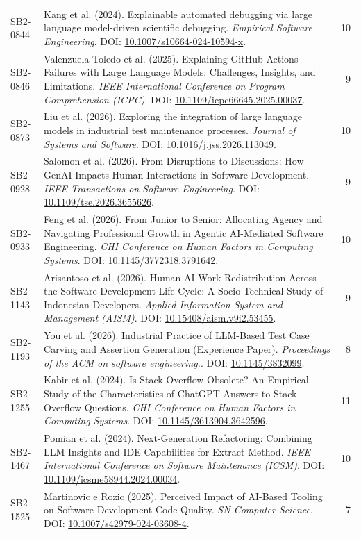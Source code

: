 \begin{small}
\begin{longtable}{lp{11.2cm}r}
SB2-0844 & Kang et al. (2024). Explainable automated debugging via large language model-driven scientific debugging. \textit{Empirical Software Engineering}. DOI: \url{10.1007/s10664-024-10594-x}. & 10 \\
SB2-0846 & Valenzuela-Toledo et al. (2025). Explaining GitHub Actions Failures with Large Language Models: Challenges, Insights, and Limitations. \textit{IEEE International Conference on Program Comprehension (ICPC)}. DOI: \url{10.1109/icpc66645.2025.00037}. & 9 \\
SB2-0873 & Liu et al. (2026). Exploring the integration of large language models in industrial test maintenance processes. \textit{Journal of Systems and Software}. DOI: \url{10.1016/j.jss.2026.113049}. & 10 \\
SB2-0928 & Salomon et al. (2026). From Disruptions to Discussions: How GenAI Impacts Human Interactions in Software Development. \textit{IEEE Transactions on Software Engineering}. DOI: \url{10.1109/tse.2026.3655626}. & 9 \\
SB2-0933 & Feng et al. (2026). From Junior to Senior: Allocating Agency and Navigating Professional Growth in Agentic AI-Mediated Software Engineering. \textit{CHI Conference on Human Factors in Computing Systems}. DOI: \url{10.1145/3772318.3791642}. & 10 \\
SB2-1143 & Arisantoso et al. (2026). Human-AI Work Redistribution Across the Software Development Life Cycle: A Socio-Technical Study of Indonesian Developers. \textit{Applied Information System and Management (AISM)}. DOI: \url{10.15408/aism.v9i2.53455}. & 9 \\
SB2-1193 & You et al. (2026). Industrial Practice of LLM-Based Test Case Carving and Assertion Generation (Experience Paper). \textit{Proceedings of the ACM on software engineering.}. DOI: \url{10.1145/3832099}. & 8 \\
SB2-1255 & Kabir et al. (2024). Is Stack Overflow Obsolete? An Empirical Study of the Characteristics of ChatGPT Answers to Stack Overflow Questions. \textit{CHI Conference on Human Factors in Computing Systems}. DOI: \url{10.1145/3613904.3642596}. & 11 \\
SB2-1467 & Pomian et al. (2024). Next-Generation Refactoring: Combining LLM Insights and IDE Capabilities for Extract Method. \textit{IEEE International Conference on Software Maintenance (ICSM)}. DOI: \url{10.1109/icsme58944.2024.00034}. & 10 \\
SB2-1525 & Martinovic e Rozic (2025). Perceived Impact of AI-Based Tooling on Software Development Code Quality. \textit{SN Computer Science}. DOI: \url{10.1007/s42979-024-03608-4}. & 7 \\

\end{longtable}
\end{small}
